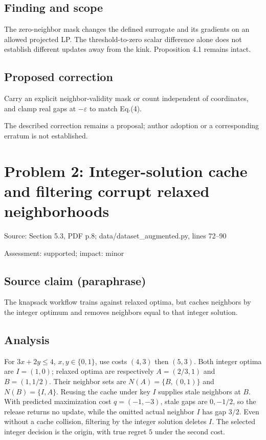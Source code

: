 \documentclass[11pt]{article}
\begin{document}
\subsection*{Finding and scope}

The zero-neighbor mask changes the defined surrogate and its gradients on an allowed projected LP. The threshold-to-zero scalar difference alone does not establish different updates away from the kink. Proposition 4.1 remains intact.

\subsection*{Proposed correction}

Carry an explicit neighbor-validity mask or count independent of coordinates, and clamp real gaps at \(-\varepsilon\) to match Eq.(4).

The described correction remains a proposal; author adoption or a corresponding erratum is not established.

\section*{Problem 2: Integer-solution cache and filtering corrupt relaxed neighborhoods}

Source: Section 5.3, PDF p.8; data/dataset\_augmented.py, lines 72–90

Assessment: supported; impact: minor

\subsection*{Source claim (paraphrase)}

The knapsack workflow trains against relaxed optima, but caches neighbors by the integer optimum and removes neighbors equal to that integer solution.

\subsection*{Analysis}

For \(3x+2y\leq4\), \(x,y\in\{0,1\}\), use costs \((4,3)\) then \((5,3)\). Both integer optima are \(I=(1,0)\); relaxed optima are respectively \(A=(2/3,1)\) and \(B=(1,1/2)\). Their neighbor sets are \(N(A)=\{B,(0,1)\}\) and \(N(B)=\{I,A\}\). Reusing the cache under key \(I\) supplies stale neighbors at \(B\). With predicted maximization cost \(q=(-1,-3)\), stale gaps are \(0,-1/2\), so the release returns no update, while the omitted actual neighbor \(I\) has gap \(3/2\). Even without a cache collision, filtering by the integer solution deletes \(I\). The selected integer decision is the origin, with true regret \(5\) under the second cost.
\end{document}

